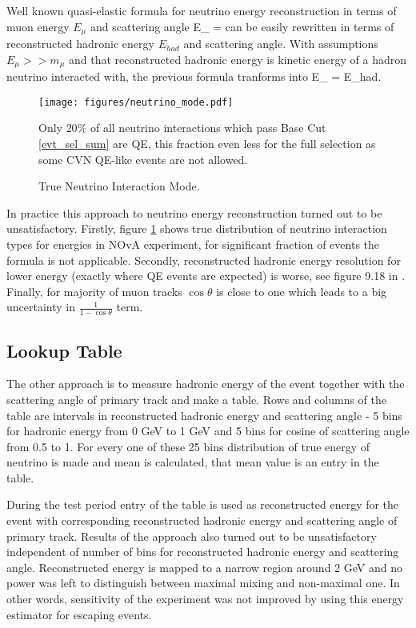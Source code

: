 Well known quasi-elastic formula for neutrino energy reconstruction in terms of muon
energy $E_\mu$ and scattering angle %
\be
E_{\nu} = 
\ee
can be easily rewritten in terms of reconstructed hadronic energy $E_{had}$ and 
scattering angle. With assumptions $E_\mu >> m_\mu$ and that reconstructed hadronic 
energy is kinetic energy of a hadron neutrino interacted with, the previous formula 
tranforms into
\be
E_{\nu} = E_{had}.
\ee
\begin{figure}[!th]
\centering
\texttt{[image: figures/neutrino\_mode.pdf]}
\caption{True Neutrino Interaction Mode.}
{Only $20\%$ of all neutrino interactions which pass Base Cut \ref{evt_sel_sum} are QE, this
fraction even less for the full selection as some CVN QE-like events are not allowed.}
\label{fig:trueInt}
\end{figure}

In practice this approach to neutrino energy reconstruction turned out to be unsatisfactory.
Firstly, figure \ref{fig:trueInt} shows true distribution of neutrino interaction types for
energies in NOvA experiment, for significant fraction of events the formula is not applicable. 
Secondly, reconstructed hadronic energy resolution for lower energy (exactly where QE
events are expected) is worse, see figure 9.18 in \cite{Susan}. Finally, for majority
of muon tracks $\cos\theta$ is close to one which leads to a big uncertainty in 
$\frac{1}{1-\cos\theta}$ term.

\subsection{Lookup Table}
The other approach is to measure hadronic energy of the event together with the scattering
angle of primary track and make a table. Rows and columns of the table are intervals in
reconstructed hadronic energy and scattering angle - 5 bins for hadronic energy from 0 GeV 
to 1 GeV and 5 bins for cosine of scattering angle from 0.5 to 1. For every one of these 25
bins distribution of true energy of neutrino is made and mean is calculated, that mean value
is an entry in the table.

During the test period entry of the table is used as reconstructed energy for the event
with corresponding reconstructed hadronic energy and scattering angle of primary track. 
Results of the approach also turned out to be unsatisfactory independent of number of bins
for reconstructed hadronic energy and scattering angle. Reconstructed energy is mapped to
a narrow region around 2 GeV and no power was left to distinguish between maximal mixing and
non-maximal one. In other words, sensitivity of the experiment was not improved by using 
this energy estimator for escaping events.

